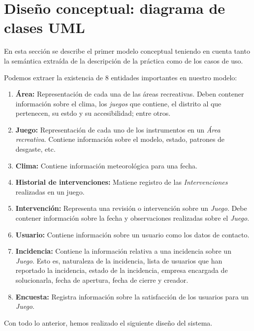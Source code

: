 \documentclass[]{article}
\begin{document}
\newpage
\section{Diseño conceptual: diagrama de clases UML}
\label{sec:disenno}
En esta sección se describe el primer modelo conceptual teniendo en cuenta tanto la semántica extraída de la descripción de la práctica como de los casos de uso.

Podemos extraer la existencia de 8 entidades importantes en nuestro modelo:
\begin{enumerate}
    \item \textbf{Área:} Representación de cada una de las áreas recreativas. Deben contener información sobre el clima, los \textit{juegos} que contiene, el distrito al que pertenecen, su estdo y su accesibilidad; entre otros.
    \item \textbf{Juego:} Representación de cada uno de los instrumentos en un \textit{Área recreativa}. Contiene información sobre el modelo, estado, patrones de desgaste, etc.
    \item \textbf{Clima:} Contiene información meteorológica para una fecha.
    \item \textbf{Historial de intervenciones:} Matiene registro de las \textit{Intervenciones} realizadas en un juego.
    \item \textbf{Intervención:} Representa una revisión o intervención sobre un \textit{Juego}. Debe contener información sobre la fecha y observaciones realizadas sobre el \textit{Juego}.
    \item \textbf{Usuario:} Contiene información sobre un usuario como los datos de contacto.
    \item \textbf{Incidencia:} Contiene la información relativa a una incidencia sobre un \textit{Juego}. Esto es, naturaleza de la incidencia, lista de usuarios que han reportado la incidencia, estado de la incidencia, empresa encargada de solucionarla, fecha de apertura, fecha de cierre y creador.
    \item \textbf{Encuesta:} Registra información sobre la satisfacción de los usuarios para un \textit{Juego}.
\end{enumerate}
Con todo lo anterior, hemos realizado el siguiente diseño del sistema.
\end{document}
